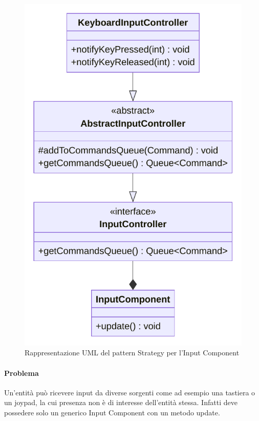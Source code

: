 \documentclass[a4paper,12pt]{report}
\begin{document}
\begin{figure}[H]
\centering{}
\includegraphics[scale=0.75]{img/InputControllerUML}
\caption{Rappresentazione UML del pattern Strategy per l'Input Component}
\label{img:strategy}
\end{figure}

\paragraph{Problema} Un’entità può ricevere input da diverse sorgenti come ad esempio una tastiera o un joypad, 
la cui presenza non è di interesse dell’entità stessa. 
Infatti deve possedere solo un generico Input Component con un metodo update.
\end{document}
